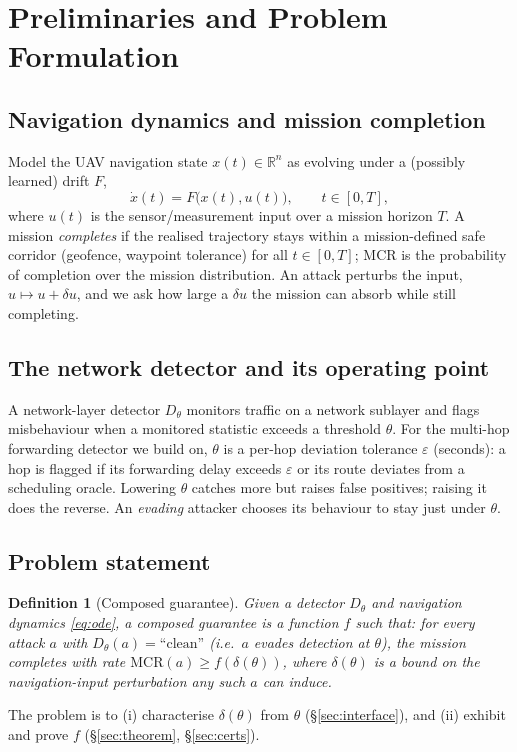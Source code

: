\documentclass[conference]{IEEEtran}
\newcommand{\Real}{\mathbb{R}}
\newcommand{\MCR}{\mathrm{MCR}}
\newtheorem{definition}{Definition}
\begin{document}
\section{Preliminaries and Problem Formulation}
\label{sec:prelim}
\subsection{Navigation dynamics and mission completion}
Model the UAV navigation state $x(t)\in\Real^n$ as evolving under a
(possibly learned) drift $F$,
\begin{equation}
\label{eq:ode}
\dot{x}(t) = F\big(x(t), u(t)\big), \qquad t\in[0,T],
\end{equation}
where $u(t)$ is the sensor/measurement input over a mission horizon $T$. A
mission \emph{completes} if the realised trajectory stays within a
mission-defined safe corridor (geofence, waypoint tolerance) for all $t\in[0,T]$;
$\MCR$ is the probability of completion over the mission distribution. An attack
perturbs the input, $u\mapsto u+\delta u$, and we ask how large a $\delta u$ the
mission can absorb while still completing.

\subsection{The network detector and its operating point}
A network-layer detector $D_\theta$ monitors traffic on a network sublayer and
flags misbehaviour when a monitored statistic exceeds a threshold $\theta$. For
the multi-hop forwarding detector we build on, $\theta$ is a per-hop deviation
tolerance $\varepsilon$ (seconds): a hop is flagged if its forwarding delay
exceeds $\varepsilon$ or its route deviates from a scheduling oracle. Lowering
$\theta$ catches more but raises false positives; raising it does the reverse.
An \emph{evading} attacker chooses its behaviour to stay just under $\theta$.

\subsection{Problem statement}
\begin{definition}[Composed guarantee]
Given a detector $D_\theta$ and navigation dynamics \eqref{eq:ode}, a
\emph{composed guarantee} is a function $f$ such that: for every attack $a$ with
$D_\theta(a)=\text{``clean''}$ (i.e.\ $a$ evades detection at $\theta$), the
mission completes with rate $\MCR(a)\ge f(\delta(\theta))$, where
$\delta(\theta)$ is a bound on the navigation-input perturbation any such $a$ can
induce.
\end{definition}
The problem is to (i) characterise $\delta(\theta)$ from $\theta$
(\S\ref{sec:interface}), and (ii) exhibit and prove $f$ (\S\ref{sec:theorem},
\S\ref{sec:certs}).
\end{document}
